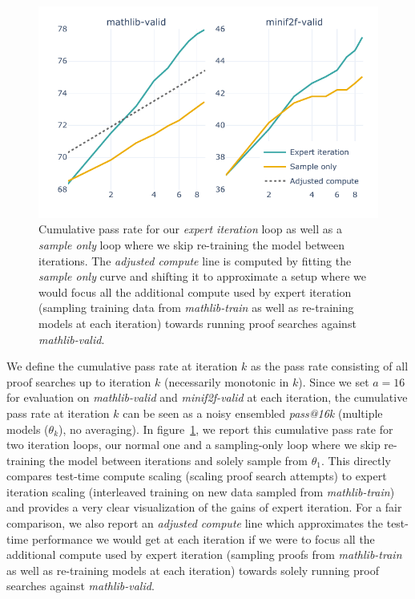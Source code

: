 \documentclass[nohyperref]{article}
\theoremstyle{plain}
\theoremstyle{definition}
\theoremstyle{remark}
\begin{document}
\begin{figure}[ht]
    \begin{center}
    \centerline{\includegraphics[width=\columnwidth]{figures/pp-mathlib-3.pdf}}
    \caption{Cumulative pass rate for our \textit{expert iteration} loop as well as a \textit{sample only} loop where we skip re-training the model between iterations. The \textit{adjusted compute} line is computed by fitting the \textit{sample only} curve and shifting it to approximate a setup where we would focus all the additional compute used by expert iteration (sampling training data from \textit{mathlib-train} as well as re-training models at each iteration) towards running proof searches against \textit{mathlib-valid}.}
    \label{fig:pp-mathlib-3}
    \end{center}
\end{figure}


We define the cumulative pass rate at iteration $k$ as the pass rate consisting of all proof searches up to iteration $k$ (necessarily monotonic in $k$). Since we set $a=16$ for evaluation on \textit{mathlib-valid} and \textit{minif2f-valid} at each iteration, the cumulative pass rate at iteration $k$ can be seen as a noisy ensembled \textit{pass@16k} (multiple models ($\theta_k$), no averaging). In figure~\ref{fig:pp-mathlib-3}, we report this cumulative pass rate for two iteration loops, our normal one and a sampling-only loop where we skip re-training the model between iterations and solely sample from $\theta_1$. This directly compares test-time compute scaling (scaling proof search attempts) to expert iteration scaling (interleaved training on new data sampled from \textit{mathlib-train}) and provides a very clear visualization of the gains of expert iteration. For a fair comparison, we also report an \textit{adjusted compute} line which approximates the test-time performance we would get at each iteration if we were to focus all the additional compute used by expert iteration (sampling proofs from \textit{mathlib-train} as well as re-training models at each iteration) towards solely running proof searches against \textit{mathlib-valid}. 
\end{document}
